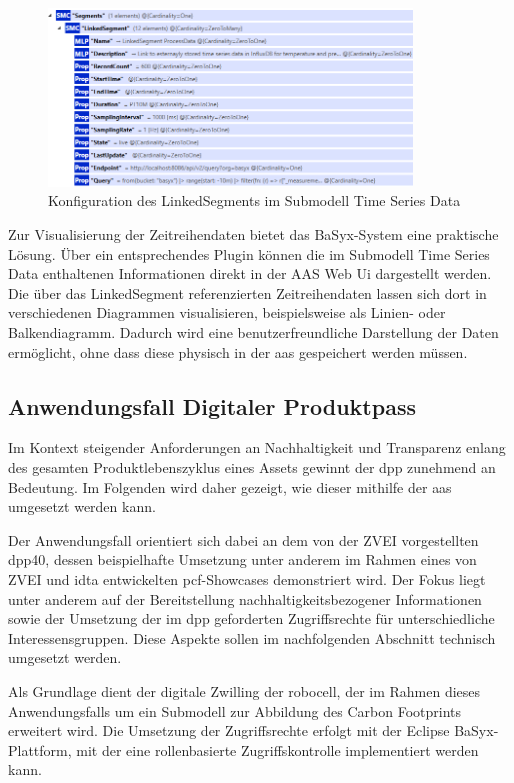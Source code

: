 \begin{figure}[htbp]
    \centering
    \includegraphics[width=0.86\textwidth]{Bilder/TimeSeries/LinkedSegment.PNG}
    \caption{Konfiguration des LinkedSegments im Submodell Time Series Data}
    \label{fig:LinkedSegmentTimeSeries}
\end{figure}

Zur Visualisierung der Zeitreihendaten bietet das BaSyx-System eine praktische Lösung.
Über ein entsprechendes Plugin können die im Submodell Time Series Data enthaltenen Informationen direkt in der AAS Web Ui dargestellt werden.
Die über das LinkedSegment referenzierten Zeitreihendaten lassen sich dort in verschiedenen Diagrammen visualisieren, beispielsweise als Linien- oder Balkendiagramm.
Dadurch wird eine benutzerfreundliche Darstellung der Daten ermöglicht, ohne dass diese physisch in der \acs{aas} gespeichert werden müssen.

\subsection{Anwendungsfall Digitaler Produktpass}
Im Kontext steigender Anforderungen an Nachhaltigkeit und Transparenz enlang des gesamten Produktlebenszyklus eines Assets gewinnt der \acs{dpp} zunehmend an Bedeutung.
Im Folgenden wird daher gezeigt, wie dieser mithilfe der \acs{aas} umgesetzt werden kann. 

Der Anwendungsfall orientiert sich dabei an dem von der ZVEI vorgestellten \acs{dpp40}, dessen beispielhafte Umsetzung unter anderem im Rahmen eines von ZVEI und \acs{idta} entwickelten \acs{pcf}-Showcases \cite{PCFShowcas} demonstriert wird. 
Der Fokus liegt unter anderem auf der Bereitstellung nachhaltigkeitsbezogener Informationen sowie der Umsetzung der im \acs{dpp} geforderten Zugriffsrechte für unterschiedliche Interessensgruppen.
Diese Aspekte sollen im nachfolgenden Abschnitt technisch umgesetzt werden.

Als Grundlage dient der digitale Zwilling der robocell, der im Rahmen dieses Anwendungsfalls um ein Submodell zur Abbildung des Carbon Footprints erweitert wird.
Die Umsetzung der Zugriffsrechte erfolgt mit der Eclipse BaSyx-Plattform, mit der eine rollenbasierte Zugriffskontrolle implementiert werden kann.

